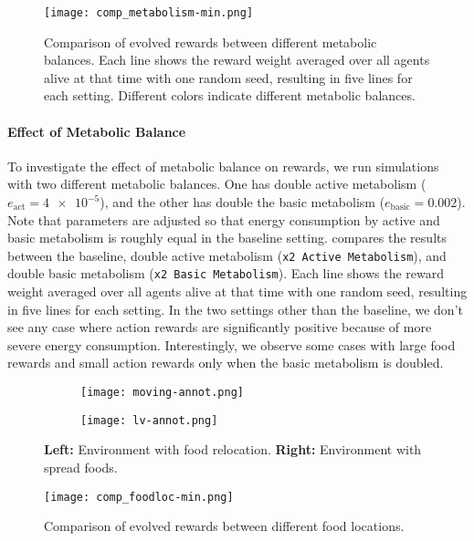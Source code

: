 \begin{figure}[t]
  \centering
  \texttt{[image: comp\_metabolism-min.png]}
  \caption{
    Comparison of evolved rewards between different metabolic balances.
    Each line shows the reward weight averaged over all agents alive at that time with one random seed, resulting in five lines for each setting.
    Different colors indicate different metabolic balances.
  }\label{figure:result-metabolism}
\end{figure}

\paragraph{Effect of Metabolic Balance}
To investigate the effect of metabolic balance on rewards, we run simulations with two different metabolic balances. One has double active metabolism ($e_{\mathrm{act}} = \num{4e-5}$), and the other has double the basic metabolism ($e_{\mathrm{basic}} = 0.002$). Note that parameters are adjusted so that energy consumption by active and basic metabolism is roughly equal in the baseline setting.
 compares the results between the baseline, double active metabolism (\texttt{x2 Active Metabolism}), and double basic metabolism (\texttt{x2 Basic Metabolism}). Each line shows the reward weight averaged over all agents alive at that time with one random seed, resulting in five lines for each setting. In the two settings other than the baseline, we don't see any case where action rewards are significantly positive because of more severe energy consumption.
Interestingly, we observe some cases with large food rewards and small action rewards only when the basic metabolism is doubled.

\begin{figure}[ht]
  \begin{subfigure}[t]{4cm}
    \centering
    \texttt{[image: moving-annot.png]}
  \end{subfigure}
  \begin{subfigure}[t]{4cm}
    \centering
    \texttt{[image: lv-annot.png]}
  \end{subfigure}
  \caption{
    \textbf{Left:} Environment with food relocation.
    \textbf{Right:} Environment with spread foods.
  }\label{figure:foodloc}
\end{figure}

\begin{figure}[ht]
  \centering
  \texttt{[image: comp\_foodloc-min.png]}
  \caption{
    Comparison of evolved rewards between different food locations.
  }\label{figure:result-foodloc}
\end{figure}

